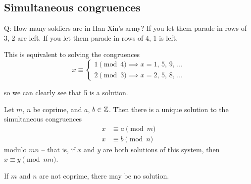 \documentclass{../../template/note}
\begin{document}
    \subsection{Simultaneous congruences}

    Q: How many soldiers are in Han Xin's army? If you let them parade in rows of 3, 2 are left. If you let them parade in rows of 4, 1 is left.

    This is equivalent to solving the congruences
    \[
        x \equiv \begin{cases}
            1 \pmod 4 \implies x = 1, \, 5, \, 9, \, \dots\\
            2 \pmod 3\implies x = 2, \, 5, \, 8, \, \dots
        \end{cases}
    \]
    
    so we can clearly see that 5 is a solution.

    \begin{theorem}
        Let \(m\), \(n\) be coprime, and \(a\), \(b \in \mathbb Z\). Then there is a unique solution to the simultaneous congruences
        \begin{align*}
            x &\equiv a \pmod m \\
            x &\equiv b \pmod n
        \end{align*}
        modulo \(mn\) -- that is, if \(x\) and \(y\) are both solutions of this system, then \(x \equiv y \pmod{mn}\).
        \label{chinese-remainder-theorem}
    \end{theorem}
    
    \begin{remark*}
        If \(m\) and \(n\) are not coprime, there may be no solution.
    \end{remark*}
    
\end{document}
